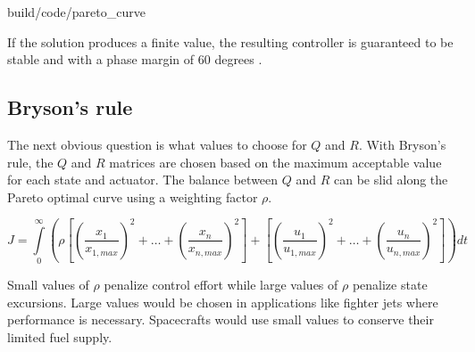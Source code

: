 \begin{svg}{build/code/pareto_curve}
  \caption{Pareto optimal curve for LQR}
  \label{fig:pareto_curve}
\end{svg}

If the solution produces a finite value, the resulting controller is guaranteed
to be stable and  with a \gls{phase margin} of 60
degrees \cite{bib:lqr-derivs}.

\subsection{Bryson's rule}

The next obvious question is what values to choose for $Q$ and $R$. With
Bryson's rule, the $Q$ and $R$ matrices are chosen based on the maximum
acceptable value for each \gls{state} and actuator. The balance between $Q$ and
$R$ can be slid along the Pareto optimal curve using a weighting factor $\rho$.

\begin{equation*}
  J = \int\limits_0^\infty \left(\rho \left[
    \left(\frac{x_1}{x_{1,max}}\right)^2 + \ldots +
    \left(\frac{x_n}{x_{n,max}}\right)^2\right] + \left[
    \left(\frac{u_1}{u_{1,max}}\right)^2 + \ldots +
    \left(\frac{u_n}{u_{n,max}}\right)^2\right]\right) dt
\end{equation*}

Small values of $\rho$ penalize control effort while large values of $\rho$
penalize \gls{state} excursions. Large values would be chosen in applications
like fighter jets where performance is necessary. Spacecrafts would use small
values to conserve their limited fuel supply.
